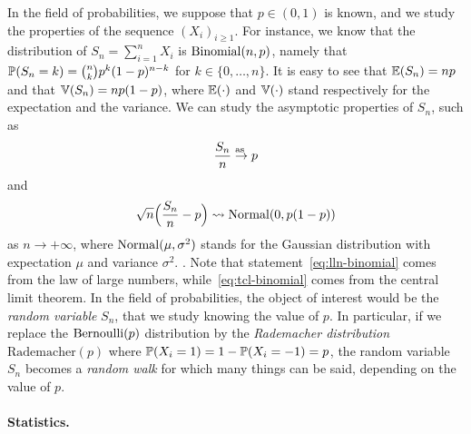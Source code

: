 In the field of probabilities, we suppose that $p \in (0, 1)$ is known, and we study the properties of the sequence $(X_i)_{i \geq 1}$. 
For instance, we know that the distribution of $S_n = \sum_{i=1}^n X_i$ is $\bin(n, p)$,  
namely that $\P(S_n = k) = \binom{n}{k} p^k (1 - p)^{n-k}$ for $k \in \{0, \ldots, n\}$.%
It is easy to see that $\E(S_n) = n p$ and that $\var(S_n) = np (1 - p)$, where $\E(\cdot)$ and $\var(\cdot)$ stand respectively for the expectation and the variance.%
%
We can study the asymptotic properties of $S_n$, such as
\begin{equation}
	\label{eq:lln-binomial}
	\frac{S_n}{n} \goas p
\end{equation}
and
\begin{equation}
	\label{eq:tcl-binomial}
	\sqrt n \Big(\frac{S_n}{n} - p\Big) \leadsto \nor(0, p(1-p))
\end{equation}
as $n \rightarrow +\infty$, where $\nor(\mu, \sigma^2)$ stands for the Gaussian distribution with expectation $\mu$ and variance $\sigma^2$.%
.
Note that statement~\eqref{eq:lln-binomial} comes from the law of large numbers, while~\eqref{eq:tcl-binomial} comes from the central limit theorem.
In the field of probabilities, the object of interest would be the \emph{random variable} $S_n$, that we study knowing the value of $p$.
In particular, if we replace the $\ber(p)$ distribution by the \emph{Rademacher distribution} $\text{Rademacher}(p)$ where $\P(X_i = 1) = 1 - \P(X_i = -1) = p$, the random variable $S_n$ becomes a \emph{random walk} for which many things can be said, depending on the value of $p$.%

\paragraph{Statistics.} %

